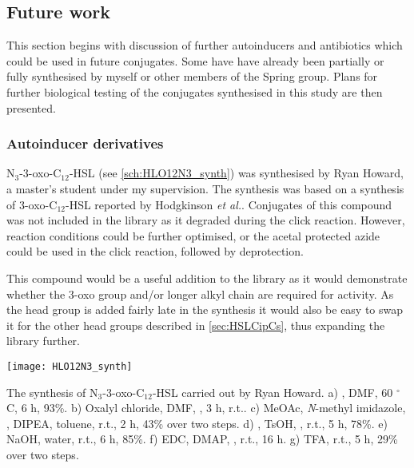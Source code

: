 \subsection{Future work \label{sec:Fut1}}

This section begins with discussion of further autoinducers and antibiotics which could be used in future conjugates. 
Some have have already been partially or fully synthesised by myself or other members of the Spring group.
Plans for further biological testing of the conjugates synthesised in this study are then presented.

\subsubsection{Autoinducer derivatives}


N$_3$-3-oxo-C$_{12}$-HSL  (see \ref{sch:HLO12N3_synth}) was synthesised by Ryan Howard, a master's student under my supervision. The synthesis was based on a synthesis of 3-oxo-C$_{12}$-HSL  reported by Hodgkinson \textit{et al.}\cite{Hodgkinson2011}. 
Conjugates of this compound was not included in the library as it degraded during the click reaction. However, reaction conditions could be further optimised, or the acetal protected azide  could be used in the click reaction, followed by deprotection.

This compound would be a useful addition to the library as it would demonstrate whether the 3-oxo group and/or longer alkyl chain are required for activity. As the head group is added fairly late in the synthesis it would also be easy to swap it for the other head groups described in \ref{sec:HSLCipCs}, thus expanding the library further.

\begin{scheme}[H]
	\begin{center}
		\texttt{[image: HLO12N3\_synth]}
		\caption{The synthesis of N$_3$-3-oxo-C$_{12}$-HSL  carried out by Ryan Howard.
		a) , DMF, 60 $^{\circ}$C, 6 h, 93\%.
		b) Oxalyl chloride, DMF, , 3 h, r.t..
		c) MeOAc, \textit{N}-methyl imidazole, , DIPEA, toluene, r.t., 2 h, 43\% over two steps.
		d) , TsOH, , r.t., 5 h, 78\%.
		e) NaOH, water, r.t., 6 h, 85\%.
		f) EDC, DMAP, , r.t., 16 h.
		g) TFA, r.t., 5 h, 29\% over two steps.
		\label{sch:HLO12N3_synth}}
	\end{center}
\end{scheme}

